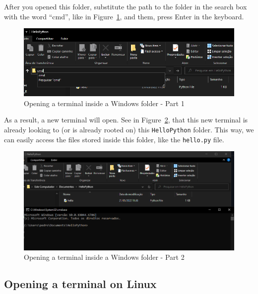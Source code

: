\documentclass[
  11pt,
  letterpaper,
  DIV=11,
  numbers=noendperiod]{scrreprt}
\begin{document}
After you opened this folder, substitute the path to the folder in the
search box with the word ``cmd'', like in
Figure~\ref{fig-windows-hello-folder2}, and them, press Enter in the
keyboard.

\begin{figure}

{\centering \includegraphics{Chapters/../Figures/windows-hello-folder2.png}

}

\caption{\label{fig-windows-hello-folder2}Opening a terminal inside a
Windows folder - Part 1}

\end{figure}

As a result, a new terminal will open. See in
Figure~\ref{fig-windows-terminal}, that this new terminal is already
looking to (or is already rooted on) this \texttt{HelloPython} folder.
This way, we can easily access the files stored inside this folder, like
the \texttt{hello.py} file.

\begin{figure}

{\centering \includegraphics{Chapters/../Figures/windows-terminal.png}

}

\caption{\label{fig-windows-terminal}Opening a terminal inside a Windows
folder - Part 2}

\end{figure}

\hypertarget{opening-a-terminal-on-linux}{%
\subsection{Opening a terminal on
Linux}\label{opening-a-terminal-on-linux}}
\end{document}
